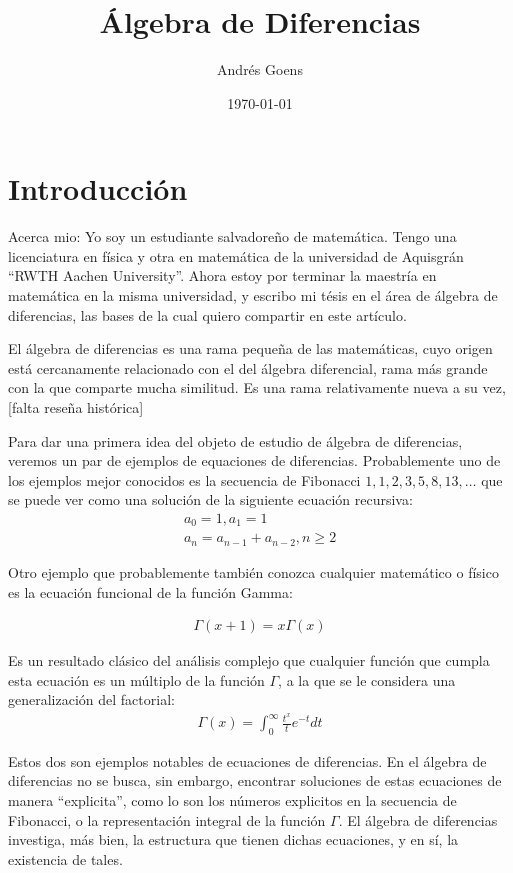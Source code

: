 \documentclass[12pt,a4paper,BCOR15mm,twoside,DIV12]{article}
\title{Álgebra de Diferencias}
\author{Andr\'{e}s Goens}
\date{\today}
\theoremstyle{definition}
\begin{document}
\maketitle
\section{Introducción}

Acerca mio: Yo soy un estudiante salvadoreño de matemática. Tengo una licenciatura en física y otra en matemática de la universidad de Aquisgrán ``RWTH Aachen University''.
Ahora estoy por terminar la maestría en matemática en la misma universidad, y escribo mi tésis en el área de álgebra de diferencias, las bases de la cual quiero compartir en este artículo.

El álgebra de diferencias es una rama pequeña de las matemáticas, 
cuyo origen está cercanamente relacionado con el del álgebra diferencial, 
rama más grande con la que comparte mucha similitud. Es una rama relativamente nueva a su vez, [falta reseña histórica]

Para dar una primera idea del objeto de estudio de álgebra de diferencias, veremos un par de ejemplos de equaciones de diferencias.
Probablemente uno de los ejemplos mejor conocidos es la secuencia de Fibonacci $1,1,2,3,5,8,13,\ldots$ que se puede ver como una solución
de la siguiente ecuación recursiva: 
\begin{align}
a_0 = 1,  a_1 = 1 \\ a_n = a_{n-1} + a_{n-2}, n\geq 2
\end{align}

Otro ejemplo que probablemente también conozca cualquier matemático o físico es la ecuación funcional de la función Gamma:

\begin{align}
\Gamma(x+1) = x \Gamma(x)
\end{align}

Es un resultado clásico del análisis complejo que cualquier función que cumpla esta ecuación es un múltiplo de la función $\Gamma$,
a la que se le considera una generalización del factorial:
\begin{align*}
\Gamma(x) = \int_0^\infty{\frac{t^x}{t} e^{-t} dt}
\end{align*}

Estos dos son ejemplos notables de ecuaciones de diferencias. En el álgebra de diferencias no se busca, sin embargo,
encontrar soluciones de estas ecuaciones de manera ``explicita'', como lo son los números explicitos en la secuencia de Fibonacci,
o la representación integral de la función $\Gamma$. El álgebra de diferencias investiga, más bien, la estructura que tienen dichas
ecuaciones, y en sí, la existencia de tales. 
\end{document}
